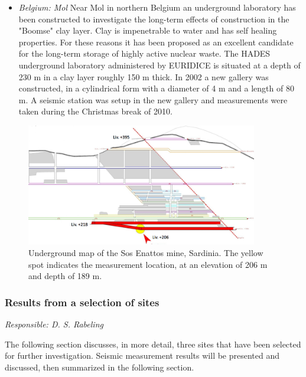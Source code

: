 \begin{itemize}
\item \emph{Belgium: Mol}
Near Mol in northern Belgium an underground laboratory has been constructed to investigate the long-term effects of construction in the "Boomse" clay layer. Clay is impenetrable to water and has self healing properties. For these reasons it has been proposed as an excellent candidate for the long-term storage of highly active nuclear waste. The HADES underground laboratory administered by EURIDICE is situated at a depth of 230 m in a clay layer roughly 150 m thick. In 2002 a new gallery was constructed, in a cylindrical form with a diameter of 4 m and a length of 80 m. A seismic station was setup in the new gallery and measurements were taken during the Christmas break of 2010.


\end{itemize}
\begin{figure}[t!]
	\begin{center}
		\includegraphics[width=0.9\textwidth]{./Sec_SiteInfra/Figures/sosanattos2}
		\caption{Underground map of the Sos Enattos mine, Sardinia. The yellow spot indicates the measurement location, at an elevation of 206 m and depth of 189 m.}
		\label{fig:sosanattos}
	\end{center}
\end{figure}

\FloatBarrier
\subsubsection{Results from a selection of sites}
\emph{
Responsible:  D. S. Rabeling  \\
}

The following section discusses, in more detail, three sites that have been selected for further investigation. Seismic measurement results will be presented and discussed, then summarized in the following section. 
\FloatBarrier
